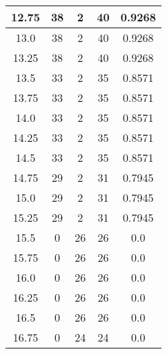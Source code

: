 \documentclass[letterpaper, 12pt]{article}
\begin{document}
\begin{longtable}{|c|c|c|c|c|}
\hline
12.75 & 38 & 2 & 40 & 0.9268 \\
\hline
13.0 & 38 & 2 & 40 & 0.9268 \\
\hline
13.25 & 38 & 2 & 40 & 0.9268 \\
\hline
13.5 & 33 & 2 & 35 & 0.8571 \\
\hline
13.75 & 33 & 2 & 35 & 0.8571 \\
\hline
14.0 & 33 & 2 & 35 & 0.8571 \\
\hline
14.25 & 33 & 2 & 35 & 0.8571 \\
\hline
14.5 & 33 & 2 & 35 & 0.8571 \\
\hline
14.75 & 29 & 2 & 31 & 0.7945 \\
\hline
15.0 & 29 & 2 & 31 & 0.7945 \\
\hline
15.25 & 29 & 2 & 31 & 0.7945 \\
\hline
15.5 & 0 & 26 & 26 & 0.0 \\
\hline
15.75 & 0 & 26 & 26 & 0.0 \\
\hline
16.0 & 0 & 26 & 26 & 0.0 \\
\hline
16.25 & 0 & 26 & 26 & 0.0 \\
\hline
16.5 & 0 & 26 & 26 & 0.0 \\
\hline
16.75 & 0 & 24 & 24 & 0.0 \\
\hline
\end{longtable}
\end{document}
